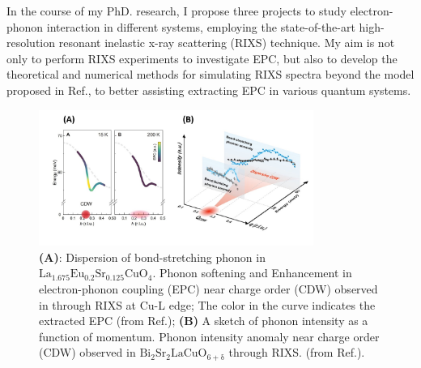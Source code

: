 \documentclass[11pt]{article}
\begin{document}
In the course of my PhD. research, I propose three projects to study electron-phonon interaction in different systems, employing the state-of-the-art high-resolution resonant inelastic x-ray scattering (RIXS) technique\cite{ament_resonant_2011,zhou_i21_2022}. 
My aim is not only to perform RIXS experiments to investigate EPC, but also to develop the theoretical and numerical methods for simulating RIXS spectra beyond the model proposed in Ref.\cite{ament_determining_2011}, to better assisting extracting EPC in various quantum systems.
\begin{figure}[!t]
    \centering
    \includegraphics[width=0.8\textwidth]{figures/new_first_figure.jpg}
    \caption{\textbf{(A)}: Dispersion of bond-stretching phonon in $\mathrm{La_{1.675}Eu_{0.2}Sr_{0.125}CuO_{4}}$. Phonon softening and Enhancement in electron-phonon coupling (EPC) near charge order (CDW) observed in  through RIXS at Cu-L edge; The color in the curve indicates the extracted EPC (from Ref.\cite{wang_charge_2021}); \textbf{(B)} A sketch of phonon intensity as a function of momentum. Phonon intensity anomaly near charge order (CDW) observed in $\mathrm{Bi_2Sr_2LaCuO_{6+\delta}}$ through RIXS.  (from Ref.\cite{li_multiorbital_2020}).}  
    \label{first_figure}
\end{figure}
\end{document}
